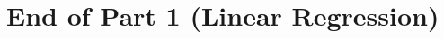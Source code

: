 \documentclass[11pt]{article}
\begin{document}
    \begin{center}
    \end{center}
    { \hspace*{\fill} \\}
    
    \section{End of Part 1 (Linear
Regression)}\label{end-of-part-1-linear-regression}


    
    
    
    
\end{document}

